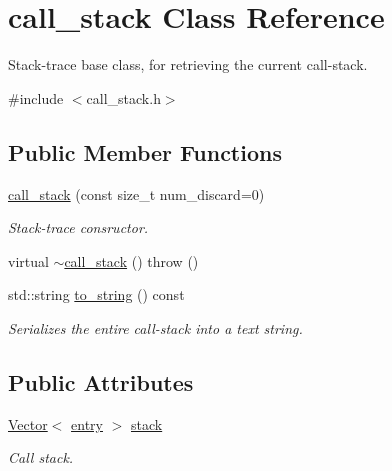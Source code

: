 \hypertarget{classstacktrace_1_1call__stack}{}\section{call\+\_\+stack Class Reference}
\label{classstacktrace_1_1call__stack}


Stack-\/trace base class, for retrieving the current call-\/stack.  




{\ttfamily \#include $<$call\+\_\+stack.\+h$>$}

\subsection*{Public Member Functions}
\begin{DoxyCompactItemize}
\item 
\mbox{\hyperlink{classstacktrace_1_1call__stack_a849ac898624b9ee9a0f6f385624243bb}{call\+\_\+stack}} (const size\+\_\+t num\+\_\+discard=0)
\begin{DoxyCompactList}\small\item\em Stack-\/trace consructor. \end{DoxyCompactList}\item 
virtual \mbox{\hyperlink{classstacktrace_1_1call__stack_ad3a052567d850f543c14edadad05a833}{$\sim$call\+\_\+stack}} ()  throw ()
\item 
std\+::string \mbox{\hyperlink{classstacktrace_1_1call__stack_aac993ecccd3d88aafefb6b8e3caa1dee}{to\+\_\+string}} () const
\begin{DoxyCompactList}\small\item\em Serializes the entire call-\/stack into a text string. \end{DoxyCompactList}\end{DoxyCompactItemize}
\subsection*{Public Attributes}
\begin{DoxyCompactItemize}
\item 
\mbox{\hyperlink{classVector}{Vector}}$<$ \mbox{\hyperlink{structstacktrace_1_1entry}{entry}} $>$ \mbox{\hyperlink{classstacktrace_1_1call__stack_afb1b12afa5abb9843b1e4136e01fda7a}{stack}}
\begin{DoxyCompactList}\small\item\em Call stack. \end{DoxyCompactList}\end{DoxyCompactItemize}


